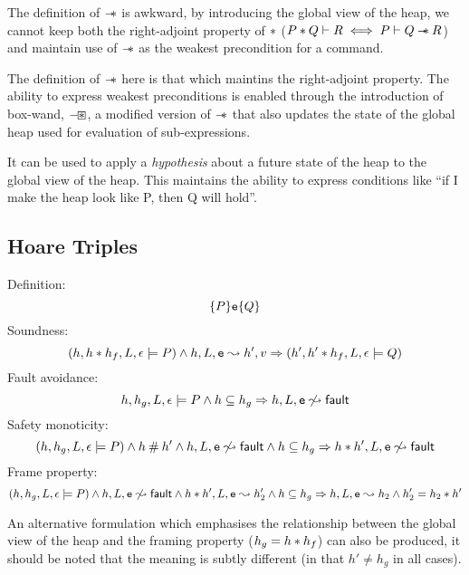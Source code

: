 \documentclass[a4paper]{article}
\begin{document}

The definition of $\mathbin{-\mkern-6mu *}$ is awkward, by introducing the global view of the
heap, we cannot keep both the right-adjoint property of $\mathbin{*}$
($P \mathbin{*} Q \vdash R \iff P \vdash Q \mathbin{-\mkern-6mu *} R$)
and maintain use of $\mathbin{-\mkern-6mu *}$ as the weakest precondition for a command.

The definition of $\mathbin{-\mkern-6mu *}$ here is that which maintins the right-adjoint property. The
ability to express weakest preconditions is enabled through the introduction
of box-wand, $\mathbin{-\mkern-3mu \boxast}$, a modified version of $\mathbin{-\mkern-6mu *}$ that also updates the
state of the global heap used for evaluation of sub-expressions.

It can be used to apply
a \emph{hypothesis} about a future state of the heap to the global view of the
heap. This maintains the ability to express conditions like ``if I make
the heap look like P, then Q will hold''.

\subsection{Hoare Triples}
Definition:
\[ \{P\}\mbox{\texttt{{\upshape e}}}\{Q\} \]
Soundness:
\[ (h, h \mathbin{*} h_f, L, \epsilon \models P) \land h, L, \mbox{\texttt{{\upshape e}}} \leadsto h', v
  \Rightarrow (h', h' \mathbin{*} h_f, L, \epsilon \models Q) \]
Fault avoidance:
\[ h, h_g, L, \epsilon \models P \land h\subseteq h_g \Rightarrow h, L, \mbox{\texttt{{\upshape e}}} \not\leadsto {\ensuremath{\mathsf{fault}}} \]
Safety monoticity:
\[ (h, h_g, L, \epsilon \models P) \land h \mathbin{\#} h' \land h, L, \mbox{\texttt{{\upshape e}}} \not\leadsto
  {\ensuremath{\mathsf{fault}}} \land h\subseteq h_g \Rightarrow h \mathbin{*} h', L, \mbox{\texttt{{\upshape e}}} \not\leadsto {\ensuremath{\mathsf{fault}}} \]
Frame property:
\[ (h, h_g, L, \epsilon \models P) \land h, L, \mbox{\texttt{{\upshape e}}} \not\leadsto {\ensuremath{\mathsf{fault}}} \land
  h \mathbin{*} h', L, \mbox{\texttt{{\upshape e}}} \leadsto h_2' \land h\subseteq h_g\Rightarrow h, L, \mbox{\texttt{{\upshape e}}} \leadsto h_2 \land
  h_2' = h_2 \mathbin{*} h' \]

An alternative formulation which emphasises the relationship between the global
view of the heap and the framing property ($h_g = h \mathbin{*} h_f$) can also be
produced, it should be noted that the meaning is subtly different (in that $h'
\neq h_g$ in all cases).
\end{document}

